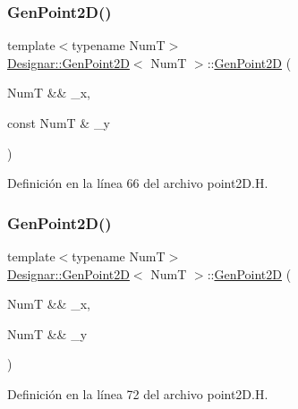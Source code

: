 \subsubsection{\texorpdfstring{Gen\+Point2\+D()}{GenPoint2D()}\hspace{0.1cm}{\footnotesize\ttfamily [4/7]}}
{\footnotesize\ttfamily template$<$typename NumT$>$ \\
\hyperlink{class_designar_1_1_gen_point2_d}{Designar\+::\+Gen\+Point2D}$<$ NumT $>$\+::\hyperlink{class_designar_1_1_gen_point2_d}{Gen\+Point2D} (\begin{DoxyParamCaption}\item[{NumT \&\&}]{\+\_\+x,  }\item[{const NumT \&}]{\+\_\+y }\end{DoxyParamCaption})\hspace{0.3cm}{\ttfamily [inline]}}



Definición en la línea 66 del archivo point2\+D.\+H.

\mbox{\label{class_designar_1_1_gen_point2_d_a420eb654ce7cbb0a9f179c20db4e7c98}} 
\subsubsection{\texorpdfstring{Gen\+Point2\+D()}{GenPoint2D()}\hspace{0.1cm}{\footnotesize\ttfamily [5/7]}}
{\footnotesize\ttfamily template$<$typename NumT$>$ \\
\hyperlink{class_designar_1_1_gen_point2_d}{Designar\+::\+Gen\+Point2D}$<$ NumT $>$\+::\hyperlink{class_designar_1_1_gen_point2_d}{Gen\+Point2D} (\begin{DoxyParamCaption}\item[{NumT \&\&}]{\+\_\+x,  }\item[{NumT \&\&}]{\+\_\+y }\end{DoxyParamCaption})\hspace{0.3cm}{\ttfamily [inline]}}



Definición en la línea 72 del archivo point2\+D.\+H.

\mbox{\label{class_designar_1_1_gen_point2_d_abb677c76a6cfb8261f562250a15ca879}} 
